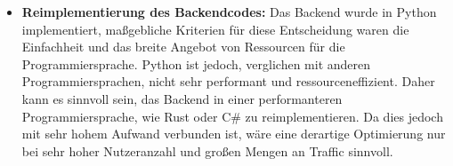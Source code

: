 \documentclass[../main.tex]{subfiles}
\begin{document}
\begin{itemize}
	\item \textbf{Reimplementierung des Backendcodes:}
	      Das Backend wurde in Python implementiert, maßgebliche Kriterien für diese Entscheidung waren die Einfachheit und das breite Angebot von Ressourcen für die
	      Programmiersprache. Python ist jedoch, verglichen mit anderen Programmiersprachen, nicht sehr performant und ressourceneffizient. Daher kann es sinnvoll sein, das
	      Backend in einer performanteren Programmiersprache, wie Rust oder C\# zu reimplementieren. Da dies jedoch mit sehr hohem Aufwand verbunden ist, wäre eine derartige
	      Optimierung nur bei sehr hoher Nutzeranzahl und großen Mengen an Traffic sinnvoll.

\end{itemize}
\end{document}
